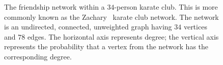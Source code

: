 \begin{figure}[!htbp]
\centering
{}
\quad
{}
\caption{The friendship network within a $34$-person karate club. This
  is more commonly known as the Zachary~\cite{Zachary1977} karate club
  network. The network is an undirected, connected, unweighted graph
  having $34$ vertices and $78$ edges. The horizontal axis represents
  degree; the vertical axis represents the probability that a vertex
  from the network has the corresponding degree.}
\label{fig:random_graphs:Zachary_karate_club}
\end{figure}

